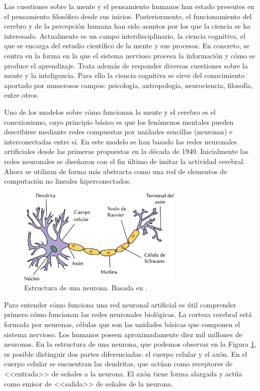 \documentclass[
  a4paper,
  12pt,
  spanish,
]{scrartcl}
\theoremstyle{teorema-style}
\begin{document}
Las cuestiones sobre la mente y el pensamiento humanos han estado presentes en el pensamiento filosófico desde sus inicios.
Posteriormente, el funcionamiento del cerebro y de la percepción humana han sido asuntos por los que la ciencia se ha interesado.
Actualmente es un campo interdisciplinario, la ciencia cognitiva, el que se encarga del estudio científico de la mente y sus procesos.
En concreto, se centra en la forma en la que el sistema nervioso procesa la información y cómo se produce el aprendizaje.
Trata además de responder diversas cuestiones sobre la mente y la inteligencia.
Para ello la ciencia cognitiva se sirve del conocimiento aportado por numerosos campos: psicología, antropología, neurociencia, filosofía, entre otros.

Uno de los modelos sobre cómo funcionan la mente y el cerebro es el conexionismo, cuyo principio básico es que los fenómenos mentales pueden describirse mediante redes compuestas por unidades sencillas (neuronas) e interconectadas entre sí.
En este modelo se han basado las redes neuronales artificiales desde las primeras propuestas en la década de 1940.
Inicialmente las redes neuronales se diseñaron con el fin último de imitar la actividad cerebral.
Ahora se utilizan de forma más abstracta como una red de elementos de computación no lineales hiperconectados.

\begin{figure}[h]
  \centering
  \includegraphics[width=0.7\textwidth]{img/neurona}
  \caption{Estructura de una neurona. Basada en \parencite{dhp1080_neurona_2007}.}
  \label{fig:neurona}
\end{figure}

Para entender cómo funciona una red neuronal artificial es útil comprender primero cómo funcionan las redes neuronales biológicas.
La corteza cerebral está formada por neuronas, células que son las unidades básicas que componen el sistema nervioso.
Los humanos poseen aproximadamente diez mil millones de neuronas.
En la estructura de una neurona, que podemos observar en la Figura \ref{fig:neurona}, es posible distinguir dos partes diferenciadas: el cuerpo celular y el axón.
En el cuerpo celular se encuentran las dendritas, que actúan como receptores de <<entrada>> de señales a la neurona.
El axón tiene forma alargada y actúa como emisor de <<salida>> de señales de la neurona.
\end{document}
